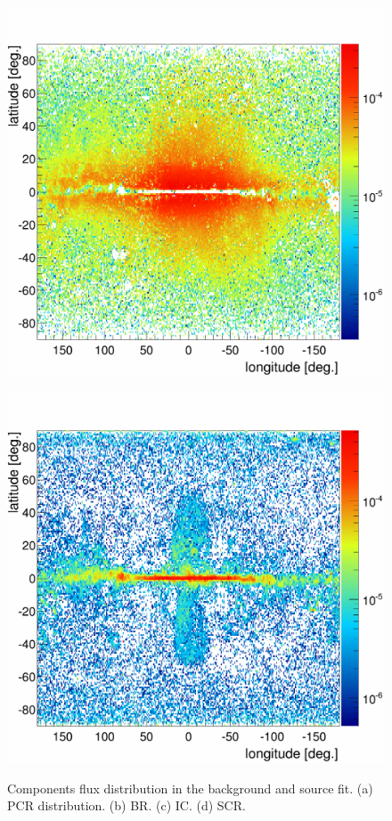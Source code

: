 \begin{figure}[H]
\begin{minipage}[h]{0.45\textwidth}
  	\subcaption{}
  	\label{app:BKGonly_BR}
  \end{minipage}
  \hfill
  \begin{minipage}[h]{0.45\textwidth}
  	\centering
	\includegraphics[width=1\linewidth]{pic/results/SCR_IC_Integral.png}
 	\subcaption{}
  	\label{app:BKGonly_IC}
  \end{minipage}
  \hfill
  \begin{minipage}[h]{0.45\textwidth}
  	\centering
	\includegraphics[width=1\linewidth]{pic/results/SCR_SCR_Integral.png}
 	\subcaption{}
  	\label{app:BKGonly_IC}
  \end{minipage}
  \caption[Components flux distribution in the background and source fit]{Components flux distribution in the background and source fit. (a) PCR distribution. (b) BR. (c) IC. (d) SCR.}
  \label{app:SCRonly_fit_distributions}
\end{figure}

